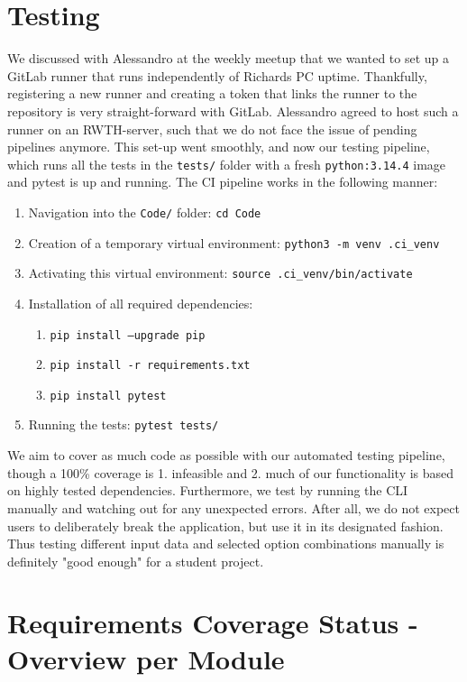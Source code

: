 \documentclass[12pt,a4paper]{article}
\begin{document}
\section{Testing}
We discussed with Alessandro at the weekly meetup that we wanted to set up a GitLab runner that runs independently of Richards PC uptime. Thankfully, registering a new runner and creating a token that links the runner to the repository is very straight-forward with GitLab. Alessandro agreed to host such a runner on an RWTH-server, such that we do not face the issue of pending pipelines anymore.
This set-up went smoothly, and now our testing pipeline, which runs all the tests in the \texttt{tests/} folder with a fresh \texttt{python:3.14.4} image and pytest is up and running. The CI pipeline works in the following manner: 
\begin{enumerate}
    \item Navigation into the \texttt{Code/} folder: \texttt{cd Code}
    \item Creation of a temporary virtual environment: \texttt{python3 -m venv .ci\_venv}
    \item Activating this virtual environment: \texttt{source .ci\_venv/bin/activate}
    \item Installation of all required dependencies: 
    \begin{enumerate}
        \item \texttt{pip install --upgrade pip}
        \item \texttt{pip install -r requirements.txt}
        \item \texttt{pip install pytest}
    \end{enumerate}
    \item Running the tests: \texttt{pytest tests/}
\end{enumerate}

We aim to cover as much code as possible with our automated testing pipeline, though a 100\% coverage is 1. infeasible and 2. much of our functionality is based on highly tested dependencies. Furthermore, we test by running the CLI manually and watching out for any unexpected errors. After all, we do not expect users to deliberately break the application, but use it in its designated fashion. Thus testing different input data and selected option combinations manually is definitely "good enough" for a student project.
\section{Requirements Coverage Status - Overview per Module}
\end{document}
